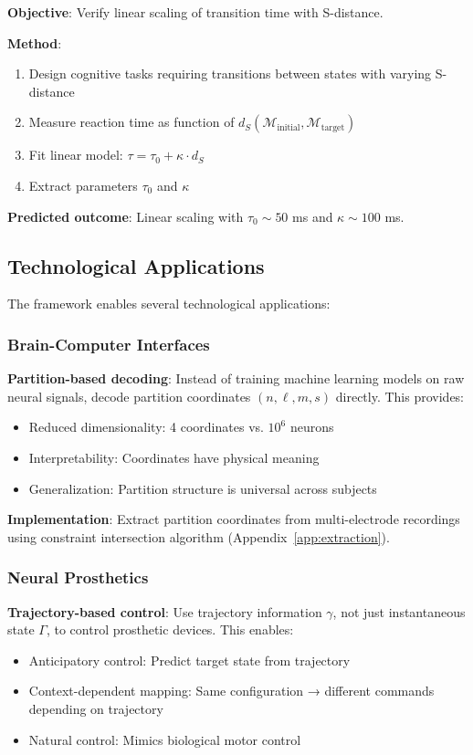 \documentclass[aps,prd,twocolumn,superscriptaddress,floatfix,nofootinbib]{revtex4-2}
\theoremstyle{remark}
\begin{document}
\textbf{Objective}: Verify linear scaling of transition time with S-distance.

\textbf{Method}:
\begin{enumerate}
\item Design cognitive tasks requiring transitions between states with varying S-distance
\item Measure reaction time as function of $d_S(\mathcal{M}_{\text{initial}}, \mathcal{M}_{\text{target}})$
\item Fit linear model: $\tau = \tau_0 + \kappa \cdot d_S$
\item Extract parameters $\tau_0$ and $\kappa$
\end{enumerate}

\textbf{Predicted outcome}: Linear scaling with $\tau_0 \sim 50$ ms and $\kappa \sim 100$ ms.

\subsection{Technological Applications}

The framework enables several technological applications:

\subsubsection{Brain-Computer Interfaces}

\textbf{Partition-based decoding}: Instead of training machine learning models on raw neural signals, decode partition coordinates $(n, \ell, m, s)$ directly. This provides:
\begin{itemize}
\item Reduced dimensionality: 4 coordinates vs. $10^6$ neurons
\item Interpretability: Coordinates have physical meaning
\item Generalization: Partition structure is universal across subjects
\end{itemize}

\textbf{Implementation}: Extract partition coordinates from multi-electrode recordings using constraint intersection algorithm (Appendix~\ref{app:extraction}).

\subsubsection{Neural Prosthetics}

\textbf{Trajectory-based control}: Use trajectory information $\gamma$, not just instantaneous state $\Gamma$, to control prosthetic devices. This enables:
\begin{itemize}
\item Anticipatory control: Predict target state from trajectory
\item Context-dependent mapping: Same configuration → different commands depending on trajectory
\item Natural control: Mimics biological motor control
\end{itemize}
\end{document}

